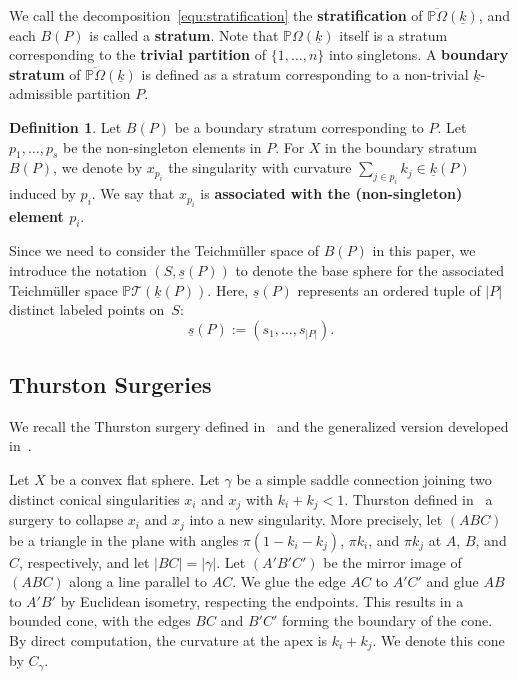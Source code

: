 \documentclass{compositio}
\numberwithin{equation}{section}
\numberwithin{figure}{section}
\theoremstyle{definition}
\newtheorem{definition}{Definition}[section]
\theoremstyle{plain}
\begin{document}
{We call the decomposition~\eqref{equ:stratification} the \textbf{stratification} of $\overline{\mathbb{P}\Omega}(\underline{k})$, and each $B(P)$ is called a \textbf{stratum}. Note that $\mathbb{P}\Omega(\underline{k})$ itself is a stratum corresponding to the \textbf{trivial partition} of $\{1,\ldots,n\}$ into singletons. A \textbf{boundary stratum} of $\overline{\mathbb{P}\Omega}(\underline{k})$ is defined as a stratum corresponding to a non-trivial $\underline{k}$-admissible partition $P$.

\begin{definition}\label{def:singularityassociatedtononsingletonelement}
    Let $B(P)$ be a boundary stratum corresponding to $P$. Let $p_1, \ldots, p_s$ be the non-singleton elements in $P$. For $X$ in the boundary stratum $B(P)$, we denote by $x_{p_i}$ the singularity with curvature $\sum_{j \in p_i} k_j\in \underline{k}(P)$ induced by $p_i$. We say that $x_{p_i}$ is \textbf{associated with the (non-singleton) element $p_i$}.
\end{definition} 

Since we need to consider the Teichmüller space of $B(P)$ in this paper, we introduce the notation $(S,\underline{s}(P))$ to denote the base sphere for the associated Teichmüller space $\mathbb{P}\mathcal{T}(\underline{k}(P))$. Here, $\underline{s}(P)$ represents an ordered tuple of $|P|$ distinct labeled points on~$S$:
\begin{equation}\label{equ:boundarybasesphere}
    \underline{s}(P) := (s_1,\ldots,s_{|P|}).
\end{equation}

\subsection{Thurston Surgeries}\label{sec:thurstonsurgeries}
We recall the Thurston surgery defined in~\cite{thu} and the generalized version developed in~\cite{fu2024uniformlengthestimatestrajectories}.

Let $X$ be a convex flat sphere. Let $\gamma$ be a simple saddle connection joining two distinct conical singularities $x_i$ and $x_j$ with $k_i + k_j < 1$. Thurston defined in~\cite{thu} a surgery to collapse $x_i$ and $x_j$ into a new singularity. More precisely, let $(ABC)$ be a triangle in the plane with angles $\pi(1 - k_i - k_j)$, $\pi k_i$, and $\pi k_j$ at $A$, $B$, and $C$, respectively, and let $|BC| = |\gamma|$. Let $(A'B'C')$ be the mirror image of $(ABC)$ along a line parallel to $AC$. We glue the edge $AC$ to $A'C'$ and glue $AB$ to $A'B'$ by Euclidean isometry, respecting the endpoints. This results in a bounded cone, with the edges $BC$ and $B'C'$ forming the boundary of the cone. By direct computation, the curvature at the apex is $k_i + k_j$. We denote this cone by $C_{\gamma}$.

}
\end{document}

